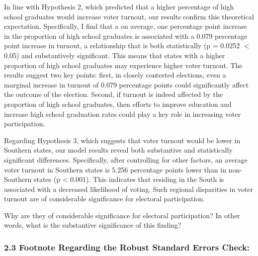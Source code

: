 \documentclass[
  letterpaper,
  DIV=11,
  numbers=noendperiod]{scrartcl}
\begin{document}
In line with Hypothesis 2, which predicted that a higher percentage of
high school graduates would increase voter turnout, our results confirm
this theoretical expectation. Specifically, I find that a on average,
one percentage point increase in the proportion of high school graduates
is associated with a 0.079 percentage point increase in turnout, a
relationship that is both statistically (p = 0.0252 \(<\) 0.05) and
substantively significant. This means that states with a higher
proportion of high school graduates may experience higher voter turnout.
The results suggest two key points: first, in closely contested
elections, even a marginal increase in turnout of 0.079 percentage
points could significantly affect the outcome of the election. Second,
if turnout is indeed affected by the proportion of high school
graduates, then efforts to improve education and increase high school
graduation rates could play a key role in increasing voter
participation.

Regarding Hypothesis 3, which suggests that voter turnout would be lower
in Southern states, our model results reveal both substantive and
statistically significant differences. Specifically, after controlling
for other factors, an average voter turnout in Southern states is 5.256
percentage points lower than in non-Southern states (p \textless{}
0.001). This indicates that residing in the South is associated with a
decreased likelihood of voting. Such regional disparities in voter
turnout are of considerable significance for electoral participation.

\begin{tcolorbox}[enhanced jigsaw, titlerule=0mm, colframe=quarto-callout-note-color-frame, rightrule=.15mm, coltitle=black, leftrule=.75mm, breakable, colback=white, toprule=.15mm, left=2mm, bottomrule=.15mm, colbacktitle=quarto-callout-note-color!10!white, opacityback=0, arc=.35mm, bottomtitle=1mm, opacitybacktitle=0.6, title=\textcolor{quarto-callout-note-color}{\faInfo}\hspace{0.5em}{Note}, toptitle=1mm]

Why are they of considerable significance for electoral participation?
In other words, what is the substantive significance of this finding?

\end{tcolorbox}

\hypertarget{footnote-regarding-the-robust-standard-errors-check}{%
\subsubsection{\texorpdfstring{\textbf{2.3} Footnote Regarding the
Robust Standard Errors
Check:}{2.3 Footnote Regarding the Robust Standard Errors Check:}}\label{footnote-regarding-the-robust-standard-errors-check}}
\end{document}
